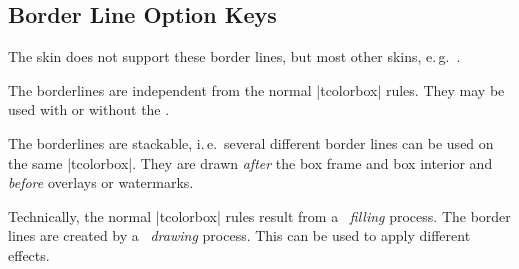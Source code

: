 \clearpage
\subsection{Border Line Option Keys}\label{subsec:borderline}
The skin  does not support these border lines,
but most other skins, e.\,g.\ .

The borderlines are independent from the normal |tcolorbox| rules.
They may be used with or without the .

The borderlines are stackable, i.\,e.\ several different border lines can be
used on the same |tcolorbox|. They are drawn \emph{after} the box frame and box
interior and \emph{before} overlays or watermarks.

\begin{marker}
Technically, the normal |tcolorbox| rules result from a \tikzname\  \emph{filling}
process. The border lines are created by a \tikzname\  \emph{drawing} process.
This can be used to apply different effects.
\end{marker}



